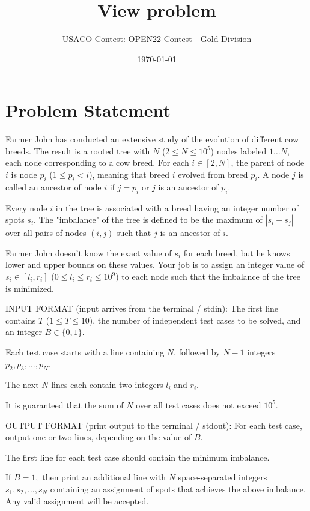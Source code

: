 \documentclass[12pt]{article}
\title{View problem}
\author{USACO Contest: OPEN22 Contest - Gold Division}
\date{\today}
\begin{document}
\maketitle

\section*{Problem Statement}

Farmer John has conducted an extensive study of the evolution of different cow
breeds.  The result is a rooted tree with $N$ ($2\le N\le 10^5$) nodes  labeled
$1\ldots N$, each node corresponding to a cow breed.   For each $i\in [2,N]$,
the parent of node $i$ is node $p_i$ ($1\le p_i<i$), meaning that breed $i$
evolved from breed $p_i$. A node $j$ is called an ancestor of node $i$ if
$j=p_i$ or $j$ is an ancestor of $p_i$.

Every node $i$ in the tree is associated with a breed having an integer number
of spots $s_i$.  The "imbalance" of the tree is defined to be the maximum of
$|s_i-s_j|$ over all pairs of nodes $(i,j)$ such that $j$ is an ancestor of $i$.

Farmer John doesn't know the exact value of $s_i$ for each breed, but he knows
lower and upper bounds on these values.  Your  job is to assign an integer value
of $s_i \in [l_i,r_i]$ ($0\le l_i\le r_i\le 10^9$) to each node such that the
imbalance of the tree is minimized. 

INPUT FORMAT (input arrives from the terminal / stdin):
The first line contains $T$ ($1\le T\le 10$), the number of independent test
cases to be solved, and an integer $B\in \{0,1\}$.

Each test case starts with a line containing $N$, followed by $N-1$ integers
$p_2,p_3,\ldots,p_N$.

The next $N$ lines each contain two integers $l_i$ and $r_i$.

It is guaranteed that the sum of $N$ over all test cases does not exceed $10^5$.

OUTPUT FORMAT (print output to the terminal / stdout):
For each test case, output one or two lines, depending on the value of $B$.

The first line for each test case should contain the minimum imbalance.

If $B=1,$ then print an additional line with $N$ space-separated integers
$s_1,s_2,\ldots, s_N$ containing an assignment of spots that achieves the above
imbalance. Any valid assignment will be accepted.
\end{document}
